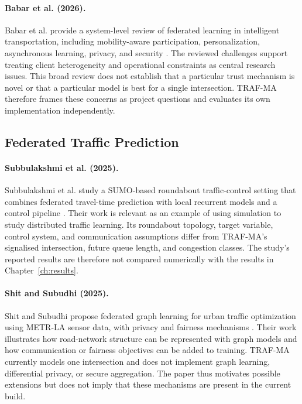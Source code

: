 \paragraph{Babar et al. (2026).}
Babar et al. provide a system-level review of federated learning in intelligent transportation, including mobility-aware participation, personalization, asynchronous learning, privacy, and security \cite{babar2026}. The reviewed challenges support treating client heterogeneity and operational constraints as central research issues. This broad review does not establish that a particular trust mechanism is novel or that a particular model is best for a single intersection. TRAF-MA therefore frames these concerns as project questions and evaluates its own implementation independently.

\subsection{Federated Traffic Prediction}
\paragraph{Subbulakshmi et al. (2025).}
Subbulakshmi et al. study a SUMO-based roundabout traffic-control setting that combines federated travel-time prediction with local recurrent models and a control pipeline \cite{subbulakshmi2025}. Their work is relevant as an example of using simulation to study distributed traffic learning. Its roundabout topology, target variable, control system, and communication assumptions differ from TRAF-MA's signalised intersection, future queue length, and congestion classes. The study's reported results are therefore not compared numerically with the results in Chapter~\ref{ch:results}.

\paragraph{Shit and Subudhi (2025).}
Shit and Subudhi propose federated graph learning for urban traffic optimization using METR-LA sensor data, with privacy and fairness mechanisms \cite{shit2025}. Their work illustrates how road-network structure can be represented with graph models and how communication or fairness objectives can be added to training. TRAF-MA currently models one intersection and does not implement graph learning, differential privacy, or secure aggregation. The paper thus motivates possible extensions but does not imply that these mechanisms are present in the current build.

